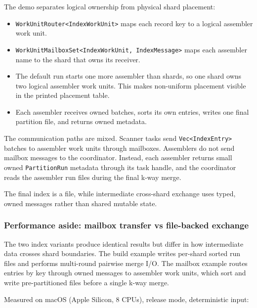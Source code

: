 The demo separates logical ownership from physical shard placement:

\begin{itemize}
    \item \texttt{WorkUnitRouter<IndexWorkUnit>} maps each record key to a
          logical assembler work unit.
    \item \texttt{WorkUnitMailboxSet<IndexWorkUnit, IndexMessage>} maps each
          assembler name to the shard that owns its receiver.
    \item The default run starts one more assembler than shards, so one shard
          owns two logical assembler work units. This makes non-uniform
          placement visible in the printed placement table.
    \item Each assembler receives owned batches, sorts its own entries, writes
          one final partition file, and returns owned metadata.
\end{itemize}

The communication paths are mixed. Scanner tasks send \texttt{Vec<IndexEntry>} batches to assembler work units through mailboxes.
Assemblers do not send mailbox messages to the coordinator. Instead, each
assembler returns small owned \texttt{PartitionRun} metadata through its task
handle, and the coordinator reads the assembler run files during the final
k-way merge.

The final index is a file, while intermediate cross-shard exchange uses typed,
owned messages rather than shared mutable state.

\subsubsection{Performance aside: mailbox transfer vs file-backed exchange}

The two index variants produce identical results but differ in how intermediate
data crosses shard boundaries. The build example writes per-shard sorted run
files and performs multi-round pairwise merge I/O. The mailbox example routes
entries by key through owned messages to assembler work units, which sort and
write pre-partitioned files before a single k-way merge.

Measured on macOS (Apple Silicon, 8 CPUs), release mode, deterministic input:

